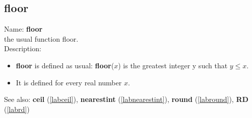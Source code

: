 \subsection{floor}
\label{labfloor}
\noindent Name: \textbf{floor}\\
the usual function floor.\\
\noindent Description: \begin{itemize}

\item \textbf{floor} is defined as usual: \textbf{floor}($x$) is the greatest integer y such that $y \le x$.

\item It is defined for every real number $x$.
\end{itemize}
See also: \textbf{ceil} (\ref{labceil}), \textbf{nearestint} (\ref{labnearestint}), \textbf{round} (\ref{labround}), \textbf{RD} (\ref{labrd})
